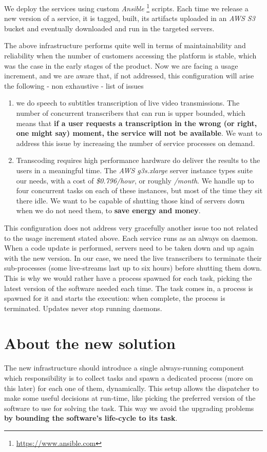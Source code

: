 \documentclass{article}
\begin{document}
We deploy the services using custom \textit{Ansible} \footnote{\url{https://www.ansible.com}} scripts. Each time we release a new version of a service, it is tagged, built, its artifacts uploaded in an \textit{AWS S3} bucket and eventually downloaded and run in the targeted servers.

The above infrastructure performs quite well in terms of maintainability and reliability when the number of customers accessing the platform is stable, which was the case in the early stages of the product. Now we are facing a usage increment, and we are aware that, if not addressed, this configuration will arise the following - non exhaustive - list of issues

\begin{enumerate}
    \item we do speech to subtitles transcription of live video transmissions. The number of concurrent transcribers that can run is upper bounded, which means that \textbf{if a user requests a transcription in the wrong (or right, one might say) moment, the service will not be available}. We want to address this issue by increasing the number of service processes on demand.
    \item Transcoding requires high performance hardware do deliver the results to the users in a meaningful time. The \textit{AWS g3s.xlarge} server instance types suite our needs, with a cost of \textit{\$0.796/hour}, or roughly \textit{/month}. We handle up to four concurrent tasks on each of these instances, but most of the time they sit there idle. We want to be capable of shutting those kind of servers down when we do not need them, to \textbf{save energy and money}.
\end{enumerate}

This configuration does not address very gracefully another issue too not related to the usage increment stated above. Each service runs as an always on daemon. When a code update is performed, servers need to be taken down and up again with the new version. In our case, we need the live transcribers to terminate their sub-processes (some live-streams last up to six hours) before shutting them down. This is why we would rather have a process spawned for each task, picking the latest version of the software needed each time. The task comes in, a process is spawned for it and starts the execution: when complete, the process is terminated. Updates never stop running daemons.

\section{About the new solution}
The new infrastructure should introduce a single always-running component which responsibility is to collect tasks and spawn a dedicated process (more on this later) for each one of them, dynamically. 
This setup allows the dispatcher to make some useful decisions at run-time, like picking the preferred version of the software to use for solving the task. This way we avoid the upgrading problems \textbf{by bounding the software's life-cycle to its task}.
\end{document}

